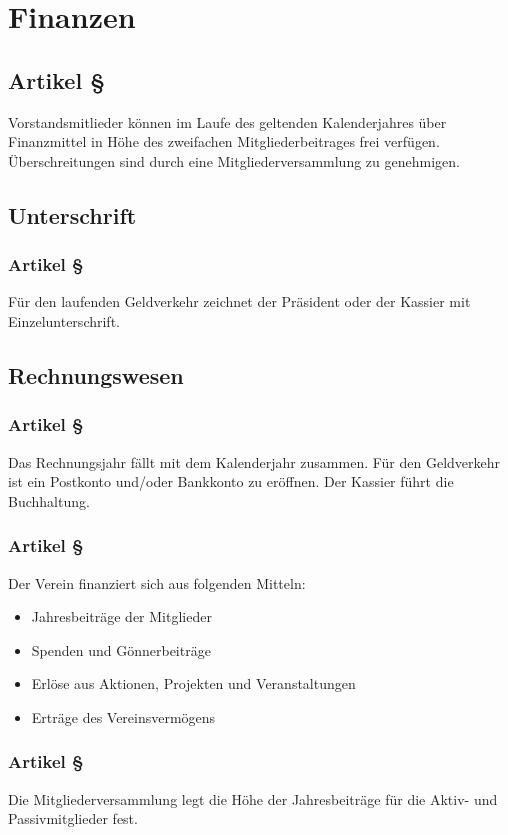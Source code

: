\section{Finanzen}

\subsection*{Artikel §\articlenumber}
Vorstandsmitlieder können im Laufe des geltenden 
Kalenderjahres über Finanzmittel in Höhe des zweifachen
Mitgliederbeitrages frei verfügen. Überschreitungen sind
durch eine Mitgliederversammlung zu genehmigen.

\subsection{Unterschrift}

\subsubsection*{Artikel §\articlenumber}
Für den laufenden Geldverkehr zeichnet der Präsident oder 
der Kassier mit Einzelunterschrift.

\subsection{Rechnungswesen}

\subsubsection*{Artikel §\articlenumber}
Das Rechnungsjahr fällt mit dem Kalenderjahr zusammen. Für
den Geldverkehr ist ein Postkonto und/oder Bankkonto zu
eröffnen. Der Kassier führt die Buchhaltung.

\subsubsection*{Artikel §\articlenumber}
Der Verein finanziert sich aus folgenden Mitteln:
\begin{itemize}
\item Jahresbeiträge der Mitglieder
\item Spenden und Gönnerbeiträge
\item Erlöse aus Aktionen, Projekten und Veranstaltungen
\item Erträge des Vereinsvermögens
\end{itemize}
 
\subsubsection*{Artikel §\articlenumber}
Die Mitgliederversammlung legt die Höhe der Jahresbeiträge 
für die Aktiv- und Passivmitglieder fest.

